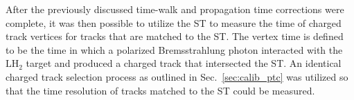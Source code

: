 
After the previously discussed time-walk and propagation time corrections were complete, it was then possible to utilize the ST to measure the time of charged track vertices for tracks that are matched to the ST.  The vertex time is defined to be the time in which a polarized Bremsstrahlung photon interacted with the $\mathrm{LH_{2}}$ target and produced a charged track that intersected the ST.  An identical charged track selection process as outlined in Sec.~\ref{sec:calib_ptc} was utilized so that the time resolution of tracks matched to the ST could be measured.

